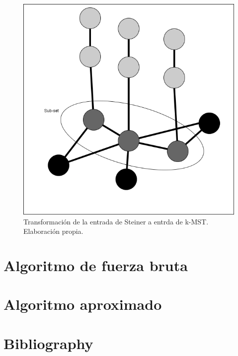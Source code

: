 \documentclass[spanish,12pt]{elsarticle}
\begin{document}
\begin{figure}[h]
    \centering
    \includegraphics[scale=0.5]{images/Trans_graph.png}
    \caption{Transformación de la entrada de Steiner a entrda de k-MST. Elaboración propia.}
    \label{fig:my_label}
\end{figure}
\section{Algoritmo de fuerza bruta}
\section{Algoritmo aproximado}





\appendix
\section*{Bibliography}


\end{document}
